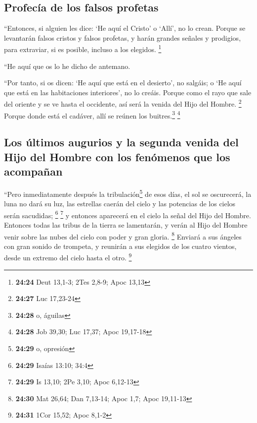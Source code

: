 \hypertarget{profecuxeda-de-los-falsos-profetas}{%
\subsection{Profecía de los falsos
profetas}\label{profecuxeda-de-los-falsos-profetas}}

 ``Entonces, si alguien les dice: `He aquí el Cristo' o
`Allí', no lo crean.  Porque se levantarán falsos cristos
y falsos profetas, y harán grandes señales y prodigios, para extraviar,
si es posible, incluso a los elegidos. \footnote{\textbf{24:24} Deut
  13,1-3; 2Tes 2,8-9; Apoc 13,13}

 ``He aquí que os lo he dicho de antemano.

 ``Por tanto, si os dicen: `He aquí que está en el
desierto', no salgáis; o `He aquí que está en las habitaciones
interiores', no lo creáis.  Porque como el rayo que sale
del oriente y se ve hasta el occidente, así será la venida del Hijo del
Hombre. \footnote{\textbf{24:27} Luc 17,23-24}  Porque
donde está el cadáver, allí se reúnen los buitres.\footnote{\textbf{24:28}
  o, águilas} \footnote{\textbf{24:28} Job 39,30; Luc 17,37; Apoc
  19,17-18}

\hypertarget{los-uxfaltimos-augurios-y-la-segunda-venida-del-hijo-del-hombre-con-los-fenuxf3menos-que-los-acompauxf1an}{%
\subsection{Los últimos augurios y la segunda venida del Hijo del Hombre
con los fenómenos que los
acompañan}\label{los-uxfaltimos-augurios-y-la-segunda-venida-del-hijo-del-hombre-con-los-fenuxf3menos-que-los-acompauxf1an}}

 ``Pero inmediatamente después la tribulación\footnote{\textbf{24:29}
  o, opresión} de esos días, el sol se oscurecerá, la luna no dará su
luz, las estrellas caerán del cielo y las potencias de los cielos serán
sacudidas; \footnote{\textbf{24:29} Isaías 13:10; 34:4} \footnote{\textbf{24:29}
  Is 13,10; 2Pe 3,10; Apoc 6,12-13}  y entonces aparecerá
en el cielo la señal del Hijo del Hombre. Entonces todas las tribus de
la tierra se lamentarán, y verán al Hijo del Hombre venir sobre las
nubes del cielo con poder y gran gloria. \footnote{\textbf{24:30} Mat
  26,64; Dan 7,13-14; Apoc 1,7; Apoc 19,11-13}  Enviará a
sus ángeles con gran sonido de trompeta, y reunirán a sus elegidos de
los cuatro vientos, desde un extremo del cielo hasta el otro.
\footnote{\textbf{24:31} 1Cor 15,52; Apoc 8,1-2}

